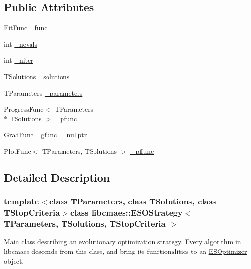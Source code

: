 \subsection*{Public Attributes}
\begin{DoxyCompactItemize}
\item 
Fit\-Func \hyperlink{classlibcmaes_1_1ESOStrategy_a1a29d4c30bbdb6021920275e81fa4dc4}{\-\_\-func}
\item 
int \hyperlink{classlibcmaes_1_1ESOStrategy_a19667f1e69856e7cfd6219b63cbaa59d}{\-\_\-nevals}
\item 
int \hyperlink{classlibcmaes_1_1ESOStrategy_aaf5c063558da34826ea1f976423ccfbb}{\-\_\-niter}
\item 
T\-Solutions \hyperlink{classlibcmaes_1_1ESOStrategy_a8fe0f8dc2201951e9e4ed2768b5a09ab}{\-\_\-solutions}
\item 
T\-Parameters \hyperlink{classlibcmaes_1_1ESOStrategy_a295e49238ceef8f11b3fb35296a8364a}{\-\_\-parameters}
\item 
Progress\-Func$<$ T\-Parameters, \\*
T\-Solutions $>$ \hyperlink{classlibcmaes_1_1ESOStrategy_a25d597189596f434a2530887fddea189}{\-\_\-pfunc}
\item 
Grad\-Func \hyperlink{classlibcmaes_1_1ESOStrategy_a76926e49a2ca941a22362167bc230093}{\-\_\-gfunc} = nullptr
\item 
Plot\-Func$<$ T\-Parameters, T\-Solutions $>$ \hyperlink{classlibcmaes_1_1ESOStrategy_af2c9909de76f98e4b9c207bda577255d}{\-\_\-pffunc}
\end{DoxyCompactItemize}


\subsection{Detailed Description}
\subsubsection*{template$<$class T\-Parameters, class T\-Solutions, class T\-Stop\-Criteria$>$class libcmaes\-::\-E\-S\-O\-Strategy$<$ T\-Parameters, T\-Solutions, T\-Stop\-Criteria $>$}

Main class describing an evolutionary optimization strategy. Every algorithm in libcmaes descends from this class, and bring its functionalities to an \hyperlink{classlibcmaes_1_1ESOptimizer}{E\-S\-Optimizer} object. 

